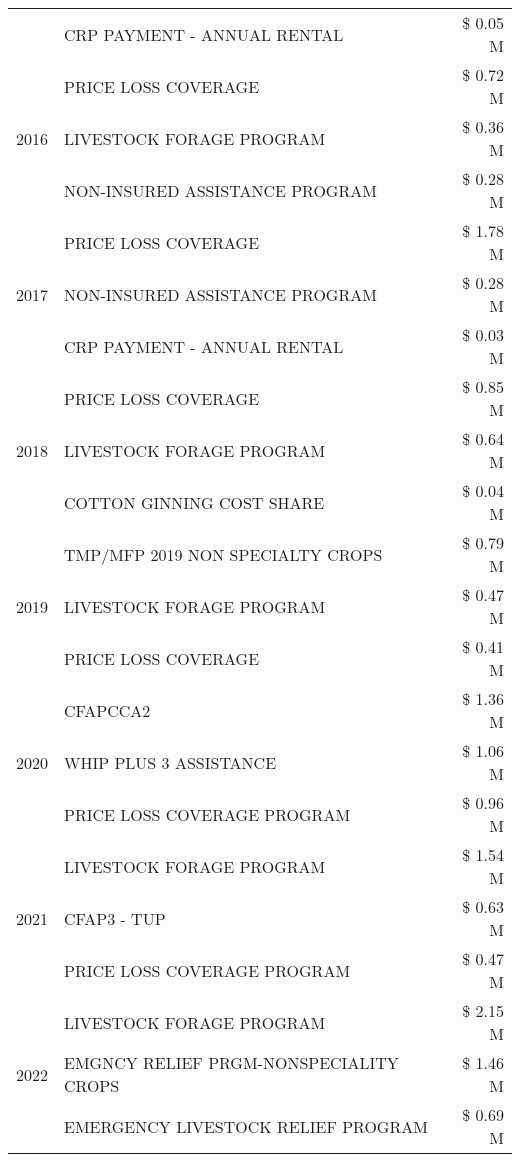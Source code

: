 \begin{tabular}{llr}
 & CRP PAYMENT - ANNUAL RENTAL & \$ 0.05 M \\
\cline{1-3}
\multirow[t]{3}{*}{2016} & PRICE LOSS COVERAGE & \$ 0.72 M \\
 & LIVESTOCK FORAGE PROGRAM & \$ 0.36 M \\
 & NON-INSURED ASSISTANCE PROGRAM & \$ 0.28 M \\
\cline{1-3}
\multirow[t]{3}{*}{2017} & PRICE LOSS COVERAGE & \$ 1.78 M \\
 & NON-INSURED ASSISTANCE PROGRAM & \$ 0.28 M \\
 & CRP PAYMENT - ANNUAL RENTAL & \$ 0.03 M \\
\cline{1-3}
\multirow[t]{3}{*}{2018} & PRICE LOSS COVERAGE & \$ 0.85 M \\
 & LIVESTOCK FORAGE PROGRAM & \$ 0.64 M \\
 & COTTON GINNING COST SHARE & \$ 0.04 M \\
\cline{1-3}
\multirow[t]{3}{*}{2019} & TMP/MFP 2019 NON SPECIALTY CROPS & \$ 0.79 M \\
 & LIVESTOCK FORAGE PROGRAM & \$ 0.47 M \\
 & PRICE LOSS COVERAGE & \$ 0.41 M \\
\cline{1-3}
\multirow[t]{3}{*}{2020} & CFAPCCA2 & \$ 1.36 M \\
 & WHIP PLUS 3 ASSISTANCE & \$ 1.06 M \\
 & PRICE LOSS COVERAGE PROGRAM & \$ 0.96 M \\
\cline{1-3}
\multirow[t]{3}{*}{2021} & LIVESTOCK FORAGE PROGRAM & \$ 1.54 M \\
 & CFAP3 - TUP & \$ 0.63 M \\
 & PRICE LOSS COVERAGE PROGRAM & \$ 0.47 M \\
\cline{1-3}
\multirow[t]{3}{*}{2022} & LIVESTOCK FORAGE PROGRAM & \$ 2.15 M \\
 & EMGNCY RELIEF PRGM-NONSPECIALITY CROPS & \$ 1.46 M \\
 & EMERGENCY LIVESTOCK RELIEF PROGRAM & \$ 0.69 M \\
\cline{1-3}
\bottomrule
\end{tabular}
